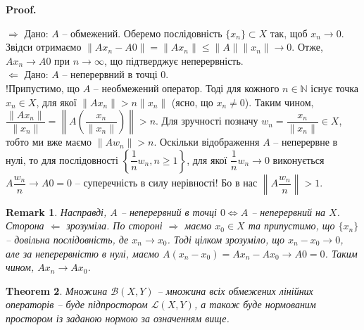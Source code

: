 \documentclass[a4paper, 10pt]{article}
\makeatletter
\def\rightproof{$\boxed{\Rightarrow}$ }
\def\leftproof{$\boxed{\Leftarrow}$ }
\theoremstyle{theoremdd}
\newtheorem{theorem}{Theorem}[subsection]
\theoremstyle{theoremdd}
\theoremstyle{theoremdd}
\theoremstyle{theoremdd}
\theoremstyle{theoremdd}
\theoremstyle{theoremdd}
\newtheorem{remark}[theorem]{Remark}
\theoremstyle{theoremdd}
\theoremstyle{theoremdd}
\renewenvironment{proof}[1][Proof.\\]{\par
\pushQED{\hfill \qed}%
\normalfont \topsep6\p@\@plus6\p@\relax
\trivlist
\item\relax
{\bfseries
#1\@addpunct{.}}\hspace\labelsep\ignorespaces
}{%
\popQED\endtrivlist\@endpefalse
}
\makeatother
\begin{document}
\begin{proof}
\rightproof Дано: $A$ -- обмежений. Оберемо послідовність $\{x_n\} \subset X$ так, щоб $x_n \to 0$. Звідси отримаємо $\|Ax_n - A0\| = \|Ax_n\| \leq \|A\| \|x_n\| \to 0$. Отже, $Ax_n \to A0$ при $n \to \infty$, що підтверджує неперервність. 
\bigskip \\
\leftproof Дано: $A$ -- неперервний в точці $0$.\\
!Припустимо, що $A$ -- необмежений оператор. Тоді для кожного $n \in \mathbb{N}$ існує точка $x_n \in X$, для якої $\|Ax_n\| > n \|x_n\|$ (ясно, що $x_n \neq 0$).  Таким чином, $\dfrac{\|Ax_n\|}{\|x_n\|} = \left\| A\left( \dfrac{x_n}{\|x_n\|} \right) \right\| > n$. Для зручності позначу $w_n = \dfrac{x_n}{\|x_n\|} \in X$, тобто ми вже маємо $\| Aw_n\| > n$. Оскільки відображення $A$ -- неперервне в нулі, то для послідовності $\left\{ \dfrac{1}{n}w_n, n \geq 1 \right\}$, для якої $\dfrac{1}{n} w_n \to 0$ виконується $A \dfrac{w_n}{n} \to A0 = 0$ -- суперечність в силу нерівності! Бо в нас $\left\| A \dfrac{w_n}{n} \right\| > 1$.
\end{proof}

\begin{remark}
Насправді, $A$ -- неперервний в точці $0 \iff A$ -- неперервний на $X$.\\
Сторона \leftproof зрозуміла. По стороні \rightproof маємо $x_0 \in X$ та припустимо, що $\{x_n\}$ -- довільна послідовність, де $x_n \to x_0$. Тоді цілком зрозуміло, що $x_n - x_0 \to 0$, але за неперервністю в нулі, маємо $A(x_n - x_0) = A x_n - A x_0 \to A0 = 0$. Таким чином, $A x_n \to A x_0$.
\end{remark}

\begin{theorem}
Множина $\mathcal{B}(X,Y)$ -- множина всіх обмежених лінійних операторів -- буде підпростором $\mathcal{L}(X,Y)$, а також буде нормованим простором із заданою нормою за означенням вище.
\end{theorem}
\end{document}
